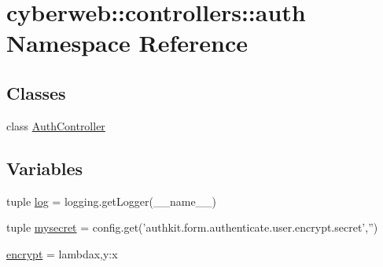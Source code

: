 \hypertarget{namespacecyberweb_1_1controllers_1_1auth}{\section{cyberweb\-:\-:controllers\-:\-:auth \-Namespace \-Reference}
\label{namespacecyberweb_1_1controllers_1_1auth}
}
\subsection*{\-Classes}
\begin{DoxyCompactItemize}
\item 
class \hyperlink{classcyberweb_1_1controllers_1_1auth_1_1_auth_controller}{\-Auth\-Controller}
\end{DoxyCompactItemize}
\subsection*{\-Variables}
\begin{DoxyCompactItemize}
\item 
tuple \hyperlink{namespacecyberweb_1_1controllers_1_1auth_a5e673f4bbac4247a6f26e55e4ec6f6bb}{log} = logging.\-get\-Logger(\-\_\-\-\_\-name\-\_\-\-\_\-)
\item 
tuple \hyperlink{namespacecyberweb_1_1controllers_1_1auth_a4c2aa2111195c06f775e3d17dd48c13d}{mysecret} = config.\-get('authkit.\-form.\-authenticate.\-user.\-encrypt.\-secret','')
\item 
\hyperlink{namespacecyberweb_1_1controllers_1_1auth_a17be375ca6587d3c9195e80006734b9c}{encrypt} = lambdax,y\-:x
\end{DoxyCompactItemize}


